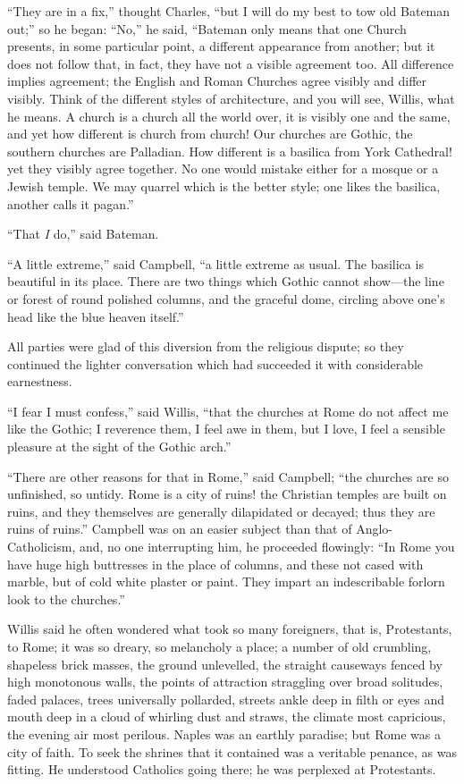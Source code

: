 ``They are in a fix,'' thought Charles, ``but I will do
my best to tow old Bateman out;'' so he began: ``No,'' he
said, ``Bateman only means that one Church presents, in some
particular point, a different appearance from another; but it does not
follow that, in fact, they have not a visible agreement too. All
difference implies agreement; the English and Roman Churches agree
visibly and differ visibly. Think of the different styles of
architecture, and you will see, Willis, what he means. A church is a
church all the world over, it is visibly one and the same, and yet how
different is church from church! Our churches are Gothic, the southern
churches are Palladian. How different is a basilica from York
Cathedral! yet they visibly agree together. No one would mistake
either for a mosque or a Jewish temple. We may quarrel which is
the better style; one likes the basilica, another calls it
pagan.''

``That \emph{I} do,'' said Bateman.

``A little extreme,'' said Campbell, ``a little extreme
as usual. The basilica is beautiful in its place. There are two things
which Gothic cannot show—the line or forest of round polished
columns, and the graceful dome, circling above one's head like the
blue heaven itself.''

All parties were glad of this diversion from the religious dispute;
so they continued the lighter conversation which had succeeded it with
considerable earnestness.

``I fear I must confess,'' said Willis, ``that the
churches at Rome do not affect me like the Gothic; I reverence them, I
feel awe in them, but I love, I feel a sensible pleasure at the sight
of the Gothic arch.''

``There are other reasons for that in Rome,'' said
Campbell; ``the churches are so unfinished, so untidy. Rome is a
city of ruins! the Christian temples are built on ruins, and they
themselves are generally dilapidated or decayed; thus they are ruins
of ruins.'' Campbell was on an easier subject than that of
Anglo-Catholicism, and, no one interrupting him, he proceeded
flowingly: ``In Rome you have huge high buttresses in the place of
columns, and these not cased with marble, but of cold white plaster or
paint. They impart an indescribable forlorn look to the
churches.''

Willis said he often wondered what took so many foreigners, that
is, Protestants, to Rome; it was so dreary, so melancholy a
place; a number of old crumbling, shapeless brick masses, the ground
unlevelled, the straight causeways fenced by high monotonous walls,
the points of attraction straggling over broad solitudes, faded
palaces, trees universally pollarded, streets ankle deep in filth or
eyes and mouth deep in a cloud of whirling dust and straws, the
climate most capricious, the evening air most perilous. Naples was an
earthly paradise; but Rome was a city of faith. To seek the shrines
that it contained was a veritable penance, as was fitting. He
understood Catholics going there; he was perplexed at Protestants.

